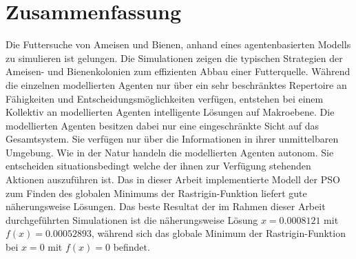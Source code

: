 \documentclass[a4paper, 11pt]{article}
\begin{document}
\section{Zusammenfassung}
Die Futtersuche von Ameisen und Bienen, anhand eines agentenbasierten Modells zu simulieren ist gelungen. Die Simulationen zeigen die typischen Strategien der Ameisen- und Bienenkolonien zum effizienten Abbau einer Futterquelle. Während die einzelnen modellierten Agenten nur über ein sehr beschränktes Repertoire an Fähigkeiten und Entscheidungsmöglichkeiten verfügen, entstehen bei einem Kollektiv an modellierten Agenten intelligente Lösungen auf Makroebene. Die modellierten Agenten besitzen dabei nur eine eingeschränkte Sicht auf das Gesamtsystem. Sie verfügen nur über die Informationen in ihrer unmittelbaren Umgebung. Wie in der Natur handeln die modellierten Agenten autonom. Sie entscheiden situationsbedingt welche der ihnen zur Verfügung stehenden Aktionen auszuführen ist.\newline \newline
Das in dieser Arbeit implementierte Modell der \acs{PSO} zum Finden des globalen Minimums der Rastrigin-Funktion liefert gute näherungsweise Lösungen. Das beste Resultat der im Rahmen dieser Arbeit durchgeführten Simulationen ist die näherungsweise Lösung $x = 0.0008121$ mit $f(x) = 0.00052893$, während sich das globale Minimum der Rastrigin-Funktion bei $x = 0$ mit $f(x)= 0$ befindet. 
\newpage
\end{document}

